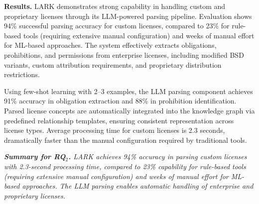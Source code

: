 \noindent\textbf{Results.} LARK demonstrates strong capability in handling custom and proprietary licenses through its LLM-powered parsing pipeline. Evaluation shows 94\% successful parsing accuracy for custom licenses, compared to 23\% for rule-based tools (requiring extensive manual configuration) and weeks of manual effort for ML-based approaches. The system effectively extracts obligations, prohibitions, and permissions from enterprise licenses, including modified BSD variants, custom attribution requirements, and proprietary distribution restrictions.

Using few-shot learning with 2–3 examples, the LLM parsing component achieves 91\% accuracy in obligation extraction and 88\% in prohibition identification. Parsed license concepts are automatically integrated into the knowledge graph via predefined relationship templates, ensuring consistent representation across license types. Average processing time for custom licenses is 2.3 seconds, dramatically faster than the manual configuration required by traditional tools.

\begin{boxK}
\textit{\textbf{Summary for RQ$_2$.} LARK achieves 94\% accuracy in parsing custom licenses with 2.3-second processing time, compared to 23\% capability for rule-based tools (requiring extensive manual configuration) and weeks of manual effort for ML-based approaches. The LLM parsing enables automatic handling of enterprise and proprietary licenses.}
\end{boxK}


